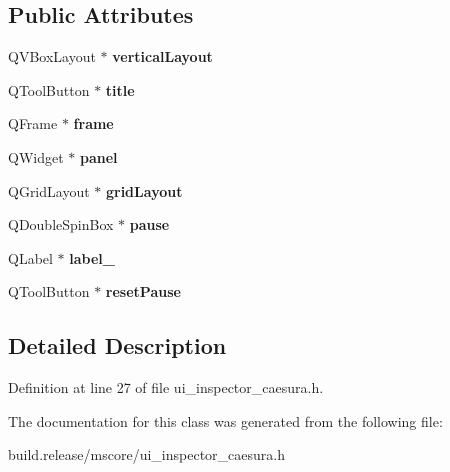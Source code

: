 \subsection*{Public Attributes}
\begin{DoxyCompactItemize}
\item 
\mbox{\label{class_ui___inspector_caesura_ab1081a2db44edf04e459d9b9bbf31d91}} 
Q\+V\+Box\+Layout $\ast$ {\bfseries vertical\+Layout}
\item 
\mbox{\label{class_ui___inspector_caesura_a875b72434f4bc73e7c1b19f8e222370d}} 
Q\+Tool\+Button $\ast$ {\bfseries title}
\item 
\mbox{\label{class_ui___inspector_caesura_aea070224d598235a914151b07aec1767}} 
Q\+Frame $\ast$ {\bfseries frame}
\item 
\mbox{\label{class_ui___inspector_caesura_a157acbb1ee64e2523ce1bff7d6f76b78}} 
Q\+Widget $\ast$ {\bfseries panel}
\item 
\mbox{\label{class_ui___inspector_caesura_a05c61a0284a48c572271d189e351b37f}} 
Q\+Grid\+Layout $\ast$ {\bfseries grid\+Layout}
\item 
\mbox{\label{class_ui___inspector_caesura_a92acf93117e57a16dc68038c2b42e90e}} 
Q\+Double\+Spin\+Box $\ast$ {\bfseries pause}
\item 
\mbox{\label{class_ui___inspector_caesura_aa5053b226309ff8f170604936cb4dda9}} 
Q\+Label $\ast$ {\bfseries label\+\_}
\item 
\mbox{\label{class_ui___inspector_caesura_ac7eae88488174d37afb1973435bfd16f}} 
Q\+Tool\+Button $\ast$ {\bfseries reset\+Pause}
\end{DoxyCompactItemize}


\subsection{Detailed Description}


Definition at line 27 of file ui\+\_\+inspector\+\_\+caesura.\+h.



The documentation for this class was generated from the following file\+:\begin{DoxyCompactItemize}
\item 
build.\+release/mscore/ui\+\_\+inspector\+\_\+caesura.\+h\end{DoxyCompactItemize}
